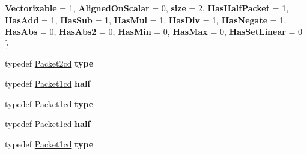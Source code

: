 \begin{DoxyCompactItemize}
{\bfseries Vectorizable} = 1, 
{\bfseries Aligned\+On\+Scalar} = 0, 
{\bfseries size} = 2, 
{\bfseries Has\+Half\+Packet} = 1, 
\newline
{\bfseries Has\+Add} = 1, 
{\bfseries Has\+Sub} = 1, 
{\bfseries Has\+Mul} = 1, 
{\bfseries Has\+Div} = 1, 
\newline
{\bfseries Has\+Negate} = 1, 
{\bfseries Has\+Abs} = 0, 
{\bfseries Has\+Abs2} = 0, 
{\bfseries Has\+Min} = 0, 
\newline
{\bfseries Has\+Max} = 0, 
{\bfseries Has\+Set\+Linear} = 0
 \}
\item 
\mbox{\label{struct_eigen_1_1internal_1_1packet__traits_3_01std_1_1complex_3_01double_01_4_01_4_a7634eba4586ad4f9ad7cb2766ba2060d}} 
typedef \hyperlink{struct_eigen_1_1internal_1_1_packet2cd}{Packet2cd} {\bfseries type}
\item 
\mbox{\label{struct_eigen_1_1internal_1_1packet__traits_3_01std_1_1complex_3_01double_01_4_01_4_a0ade4ea2669a629eea68ae4b656894c9}} 
typedef \hyperlink{struct_eigen_1_1internal_1_1_packet1cd}{Packet1cd} {\bfseries half}
\item 
\mbox{\label{struct_eigen_1_1internal_1_1packet__traits_3_01std_1_1complex_3_01double_01_4_01_4_aa201000fa7adc5d0ff2556c0b138f0e2}} 
typedef \hyperlink{struct_eigen_1_1internal_1_1_packet1cd}{Packet1cd} {\bfseries type}
\item 
\mbox{\label{struct_eigen_1_1internal_1_1packet__traits_3_01std_1_1complex_3_01double_01_4_01_4_a0ade4ea2669a629eea68ae4b656894c9}} 
typedef \hyperlink{struct_eigen_1_1internal_1_1_packet1cd}{Packet1cd} {\bfseries half}
\item 
\mbox{\label{struct_eigen_1_1internal_1_1packet__traits_3_01std_1_1complex_3_01double_01_4_01_4_aa201000fa7adc5d0ff2556c0b138f0e2}} 
typedef \hyperlink{struct_eigen_1_1internal_1_1_packet1cd}{Packet1cd} {\bfseries type}
\item 
\mbox{\label{struct_eigen_1_1internal_1_1packet__traits_3_01std_1_1complex_3_01double_01_4_01_4_a0ade4ea2669a629eea68ae4b656894c9}} 

\end{DoxyCompactItemize}
